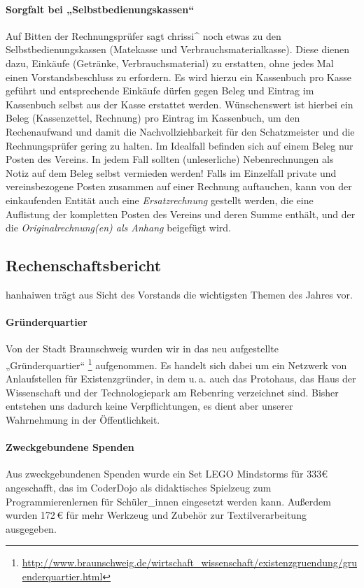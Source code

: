 \documentclass{s0minutes}
\begin{document}
\paragraph{Sorgfalt bei „Selbstbedienungskassen“}
Auf Bitten der Rechnungsprüfer sagt chrissi\^{} noch etwas zu den
Selbstbedienungskassen (Matekasse und Verbrauchsmaterialkasse). Diese dienen
dazu, Einkäufe (Getränke, Verbrauchsmaterial) zu erstatten, ohne jedes Mal einen
Vorstandsbeschluss zu erfordern. Es wird hierzu ein Kassenbuch pro Kasse geführt
und entsprechende Einkäufe dürfen gegen Beleg und Eintrag im Kassenbuch selbst
aus der Kasse erstattet werden. Wünschenswert ist hierbei ein Beleg
(Kassenzettel, Rechnung) pro Eintrag im Kassenbuch, um den Rechenaufwand und
damit die Nachvollziehbarkeit für den Schatzmeister und die Rechnungsprüfer
gering zu halten. Im Idealfall befinden sich auf einem Beleg nur Posten des
Vereins. In jedem Fall sollten (unleserliche) Nebenrechnungen als Notiz auf dem
Beleg selbst vermieden werden! Falls im Einzelfall private und vereinsbezogene
Posten zusammen auf einer Rechnung auftauchen, kann von der einkaufenden Entität
auch eine \emph{Ersatzrechnung} gestellt werden, die eine Auflistung der
kompletten Posten des Vereins und deren Summe enthält, und der die
\emph{Originalrechnung(en) als Anhang} beigefügt wird.

\subsection{Rechenschaftsbericht}
hanhaiwen trägt aus Sicht des Vorstands die wichtigsten Themen des Jahres vor.

\paragraph{Gründerquartier}
Von der Stadt Braunschweig wurden wir in das neu aufgestellte „Gründerquartier“
\footnote{\url{http://www.braunschweig.de/wirtschaft_wissenschaft/existenzgruendung/gruenderquartier.html}}
aufgenommen. Es handelt sich dabei um ein Netzwerk von Anlaufstellen für
Existenzgründer, in dem u.\,a. auch das Protohaus, das Haus der Wissenschaft
und der Technologiepark am Rebenring verzeichnet sind. Bisher entstehen uns
dadurch keine Verpflichtungen, es dient aber unserer Wahrnehmung in der
Öffentlichkeit.

\paragraph{Zweckgebundene Spenden} Aus zweckgebundenen Spenden wurde ein Set
LEGO Mindstorms für 333€ angeschafft, das im CoderDojo als didaktisches
Spielzeug zum Programmierenlernen für Schüler\_innen eingesetzt werden kann.
Außerdem wurden 172\,€ für mehr Werkzeug und Zubehör zur Textilverarbeitung
ausgegeben.
\end{document}
